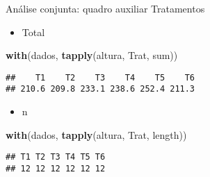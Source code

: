 \documentclass[
  ignorenonframetext,
]{beamer}
\newenvironment{Shaded}{\begin{snugshade}}{\end{snugshade}}
\newcommand{\FunctionTok}[1]{\textcolor[rgb]{0.13,0.29,0.53}{\textbf{#1}}}
\newcommand{\NormalTok}[1]{#1}
\providecommand{\tightlist}{%
  \setlength{\itemsep}{0pt}\setlength{\parskip}{0pt}}
\begin{document}
\begin{frame}[fragile]{Análise conjunta: quadro auxiliar Tratamentos}
\protect\hypertarget{anuxe1lise-conjunta-quadro-auxiliar-tratamentos}{}
\begin{itemize}
\tightlist
\item
  Total
\end{itemize}

\begin{Shaded}
\begin{Highlighting}[]
\FunctionTok{with}\NormalTok{(dados,}
     \FunctionTok{tapply}\NormalTok{(altura, Trat, }
\NormalTok{            sum))}
\end{Highlighting}
\end{Shaded}

\begin{verbatim}
##    T1    T2    T3    T4    T5    T6 
## 210.6 209.8 233.1 238.6 252.4 211.3
\end{verbatim}

\begin{itemize}
\tightlist
\item
  n
\end{itemize}

\begin{Shaded}
\begin{Highlighting}[]
\FunctionTok{with}\NormalTok{(dados,}
     \FunctionTok{tapply}\NormalTok{(altura, Trat, }
\NormalTok{            length))}
\end{Highlighting}
\end{Shaded}

\begin{verbatim}
## T1 T2 T3 T4 T5 T6 
## 12 12 12 12 12 12
\end{verbatim}
\end{frame}
\end{document}
